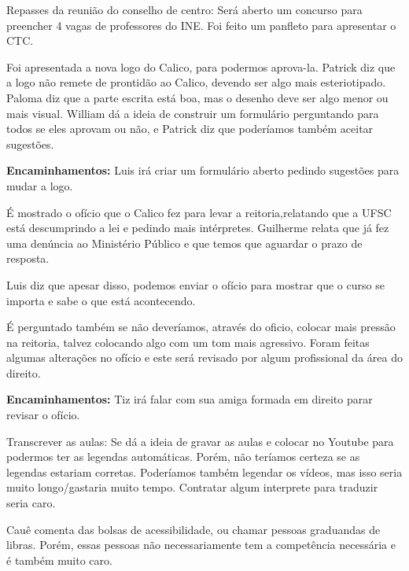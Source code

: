 \documentclass{ata-calico}
\begin{document}
\maketitle

Repasses da reunião do conselho de centro:
Será aberto um concurso para preencher 4 vagas de professores do INE.
Foi feito um panfleto para apresentar o CTC.

Foi apresentada a nova logo do Calico, para podermos aprova-la. Patrick diz que a logo não remete de prontidão ao Calico, devendo ser algo mais esteriotipado. Paloma diz que a parte escrita está boa, mas o desenho deve ser algo menor ou mais visual. William dá a ideia de construir um formulário perguntando para todos se eles aprovam ou não, e Patrick diz que poderíamos também aceitar sugestões.\newline

\textbf{Encaminhamentos:} Luis irá criar um formulário aberto pedindo sugestões para mudar a logo.


É mostrado o ofício que o Calico fez para levar a reitoria,relatando que a UFSC está descumprindo a lei e pedindo mais intérpretes. Guilherme relata que já fez uma denúncia ao Ministério Público e que temos que aguardar o prazo de resposta.

Luis diz que apesar disso, podemos enviar o ofício para mostrar que o curso se importa  e sabe o que está acontecendo. 

É perguntado também se não deveríamos, através do oficio, colocar mais pressão na reitoria, talvez colocando algo com um tom mais agressivo.
Foram feitas algumas alterações no ofício e este será revisado por algum profissional da área do direito.

\textbf{Encaminhamentos:} Tiz irá falar com sua amiga formada em direito parar revisar o ofício.


\itemize
\item{Transcrever as aulas:
Se dá a ideia de gravar as aulas e colocar no Youtube para podermos ter as legendas automáticas. Porém, não teríamos certeza se as legendas estariam corretas. Poderíamos também legendar os vídeos, mas isso seria muito longo/gastaria muito tempo. Contratar algum interprete para traduzir seria caro.}

\item{Cauê comenta das bolsas de acessibilidade, ou chamar pessoas graduandas de libras. Porém, essas pessoas não necessariamente tem a competência necessária e é também muito caro.}
\end{document}
